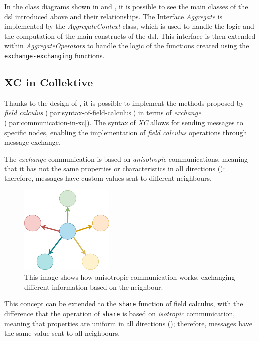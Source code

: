 In the class diagrams shown in  and , it is possible to see the main classes of the \ac{dsl}
introduced above and their relationships.
The Interface \emph{Aggregate} is implemented by the \emph{AggregateContext} class, which is used to handle the logic and the
computation of the main constructs of the \ac{dsl}.
This interface is then extended within \emph{AggregateOperators} to handle the logic of the functions created using the
\texttt{exchange-exchanging} functions.

\subsection{XC in Collektive}
\label{subsec:exchange-in-collektive}

Thanks to the design of \xc{}, it is possible to implement the methods proposed by \emph{field calculus}
(\ref{par:syntax-of-field-calculus}) in terms of \emph{exchange} (\ref{par:communication-in-xc}).
The syntax of \emph{XC} allows for sending messages to specific nodes, enabling the implementation of \emph{field calculus}
operations through message exchange.

The \emph{exchange} communication is based on \emph{anisotropic} communications, meaning that it has not the same properties
or characteristics in all directions (); therefore, messages have custom values sent to different neighbours.

\begin{figure}[h!]
    \centering
    \includegraphics[width=0.4\textwidth]{figures/anisotropic}
    \caption{This image shows how anisotropic communication works, exchanging different information based on the neighbour.}
    \label{fig:anisotropic}
\end{figure}

This concept can be extended to the \texttt{share} function of field calculus, with the difference that the
operation of \texttt{share} is based on \emph{isotropic} communication, meaning that properties are uniform in all directions
(); therefore, messages have the same value sent to all neighbours.

